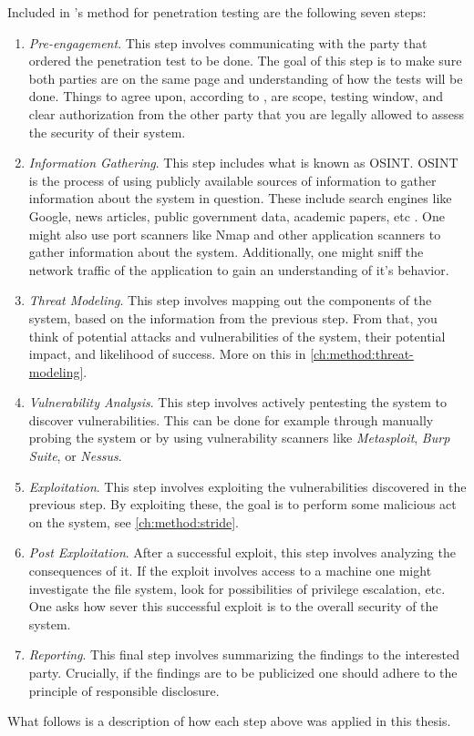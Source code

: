 Included in \citeauthor{weidman2014}'s method for penetration testing are the following seven steps:
\begin{enumerate}
    \item \textit{Pre-engagement}. This step involves communicating with the party that ordered the penetration test to be done. The goal of this step is to make sure both parties are on the same page and understanding of how the tests will be done. Things to agree upon, according to \citeauthor{weidman2014}, are scope, testing window, and clear authorization from the other party that you are legally allowed to assess the security of their system.
    \item \textit{Information Gathering}. This step includes what is known as \gls{OSINT}. \gls{OSINT} is the process of using publicly available sources of information to gather information about the system in question. These include search engines like Google, news articles, public government data, academic papers, etc \cite{steele2007open}. One might also use port scanners like Nmap and other application scanners to gather information about the system. Additionally, one might sniff the network traffic of the application to gain an understanding of it's behavior.
    \item \textit{Threat Modeling}. This step involves mapping out the components of the system, based on the information from the previous step. From that, you think of potential attacks and vulnerabilities of the system, their potential impact, and likelihood of success. More on this in \ref{ch:method:threat-modeling}.
    \item \textit{Vulnerability Analysis}. This step involves actively pentesting the system to discover vulnerabilities. This can be done for example through manually probing the system or by using vulnerability scanners like \textit{Metasploit}, \textit{Burp Suite}, or \textit{Nessus}.
    \item \textit{Exploitation}. This step involves exploiting the vulnerabilities discovered in the previous step. By exploiting these, the goal is to perform some malicious act on the system, see \ref{ch:method:stride}.
    \item \textit{Post Exploitation}. After a successful exploit, this step involves analyzing the consequences of it. If the exploit involves access to a machine one might investigate the file system, look for possibilities of privilege escalation, etc. One asks how sever this successful exploit is to the overall security of the system.
    \item \textit{Reporting}. This final step involves summarizing the findings to the interested party. Crucially, if the findings are to be publicized one should adhere to the principle of responsible disclosure.
\end{enumerate}
What follows is a description of how each step above was applied in this thesis.

